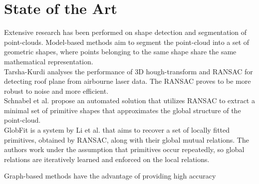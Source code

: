 \section{State of the Art}
Extensive research has been performed on shape detection and segmentation of point-clouds. Model-based methods aim to segment the point-cloud into a set of geometric shapes, where points belonging to the same shape share the same mathematical representation. 
\\
Tarsha-Kurdi\cite{tarsha2007hough} analyses the performance of 3D hough-transform and RANSAC for detecting roof plane from airbourne laser data. The RANSAC proves to be more robust to noise and more efficient.
\\
Schnabel et al. \cite{schnabel-2007-efficient} propose an automated solution that utilizes RANSAC to extract a minimal set of primitive shapes that approximates the global structure of the point-cloud.  
\\
GlobFit is a system by Li et al. \cite{li2011globfit} that aims to recover a set of locally fitted primitives, obtained by RANSAC, along with their global mutual relations. The authors work under the assumption that primitives occur repeatedly, so global relations are iteratively learned and enforced on the local relations. 

Graph-based methods have the advantage of providing high accuracy

